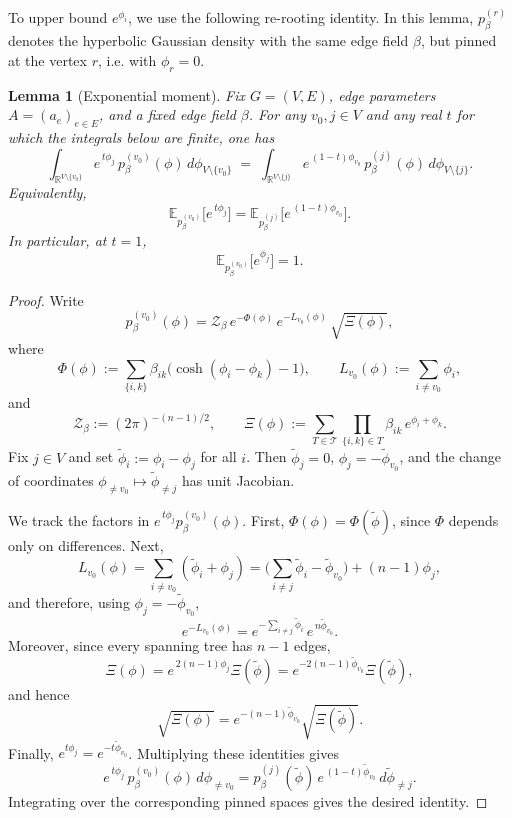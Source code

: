 \documentclass[a4paper, 11pt]{article}
\newcommand{\E}{\mathbb{E}}
\newtheorem{lem}[thm]{Lemma}
\begin{document}
To upper bound $e^{\phi_i}$, we use the following re-rooting identity. In this lemma,
$p_\beta^{(r)}$ denotes the hyperbolic Gaussian density with the same edge field $\beta$,
but pinned at the vertex $r$, i.e. with $\phi_r=0$.

\begin{lem}[Exponential moment]
\label{lem:unit}
Fix $G=(V,E)$, edge parameters $A=(a_e)_{e\in E}$, and a fixed edge field $\beta$.
For any $v_0,j\in V$ and any real $t$ for which the integrals below are finite, one has
\[
\int_{\mathbb{R}^{V\setminus\{v_0\}}} e^{\,t\phi_j}\,p_\beta^{(v_0)}(\phi)\,d\phi_{V\setminus\{v_0\}}
\;=\;
\int_{\mathbb{R}^{V\setminus\{j\}}} e^{\,(1-t)\phi_{v_0}}\,p_\beta^{(j)}(\phi)\,d\phi_{V\setminus\{j\}}.
\]
Equivalently,
\[
\E_{p_\beta^{(v_0)}}\big[e^{\,t\phi_j}\big]
=
\E_{p_\beta^{(j)}}\big[e^{\,(1-t)\phi_{v_0}}\big].
\]
In particular, at $t=1$,
\[
\E_{p_\beta^{(v_0)}}\big[e^{\phi_j}\big]=1.
\]
\end{lem}

\begin{proof}
Write
\[
p_\beta^{(v_0)}(\phi)
=
\mathcal Z_\beta\,e^{-\Phi(\phi)}\,e^{-L_{v_0}(\phi)}\,\sqrt{\Xi(\phi)},
\]
where
\[
\Phi(\phi):=\sum_{\{i,k\}}\beta_{ik}\big(\cosh(\phi_i-\phi_k)-1\big),
\qquad
L_{v_0}(\phi):=\sum_{i\ne v_0}\phi_i,
\]
and
\[
\mathcal Z_\beta:=(2\pi)^{-(n-1)/2},
\qquad
\Xi(\phi):=\sum_{T\in\mathcal T}\prod_{\{i,k\}\in T}\beta_{ik}\,e^{\phi_i+\phi_k}.
\]
Fix \(j\in V\) and set \(\widetilde\phi_i:=\phi_i-\phi_j\) for all \(i\).
Then \(\widetilde\phi_j=0\), \(\phi_j=-\widetilde\phi_{v_0}\), and the change of coordinates
\(\phi_{\neq v_0}\mapsto\widetilde\phi_{\neq j}\) has unit Jacobian.

We track the factors in \(e^{\,t\phi_j}p_\beta^{(v_0)}(\phi)\).
First, \(\Phi(\phi)=\Phi(\widetilde\phi)\), since \(\Phi\) depends only on differences. Next,
\[
L_{v_0}(\phi)
=
\sum_{i\ne v_0}(\widetilde\phi_i+\phi_j)
=
\Big(\sum_{i\ne j}\widetilde\phi_i-\widetilde\phi_{v_0}\Big)
+(n-1)\phi_j,
\]
and therefore, using \(\phi_j=-\widetilde\phi_{v_0}\),
\[
e^{-L_{v_0}(\phi)}
=
e^{-\sum_{i\ne j}\widetilde\phi_i}\,e^{\,n\widetilde\phi_{v_0}}.
\]
Moreover, since every spanning tree has \(n-1\) edges,
\[
\Xi(\phi)
=
e^{\,2(n-1)\phi_j}\Xi(\widetilde\phi)
=
e^{-2(n-1)\widetilde\phi_{v_0}}\Xi(\widetilde\phi),
\]
and hence
\[
\sqrt{\Xi(\phi)}
=
e^{-(n-1)\widetilde\phi_{v_0}}\sqrt{\Xi(\widetilde\phi)}.
\]
Finally, \(e^{t\phi_j}=e^{-t\widetilde\phi_{v_0}}\). Multiplying these identities gives
\[
e^{\,t\phi_j}\,p_\beta^{(v_0)}(\phi)\,d\phi_{\neq v_0}
=
p_\beta^{(j)}(\widetilde\phi)\,
e^{\,(1-t)\widetilde\phi_{v_0}}\,
d\widetilde\phi_{\neq j}.
\]
Integrating over the corresponding pinned spaces gives the desired identity.
\end{proof}
\end{document}

